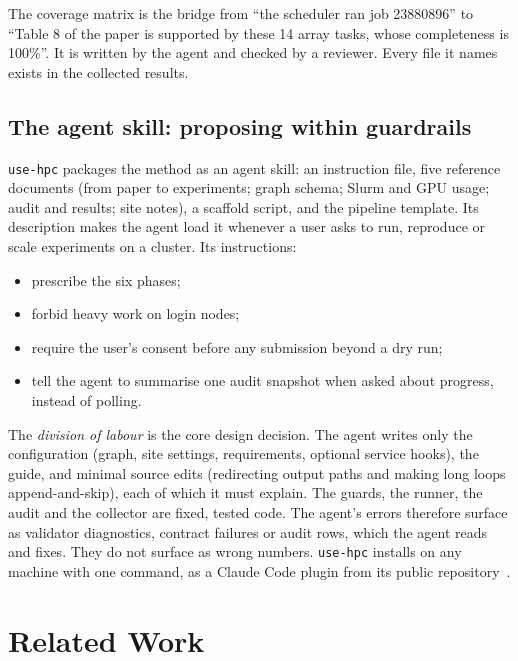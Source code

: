 \documentclass[pdflatex,sn-mathphys-num]{sn-jnl}
\theoremstyle{thmstyleone}%
\theoremstyle{thmstyletwo}%
\theoremstyle{thmstylethree}%
\newcommand{\skill}{\texttt{use-hpc}}
\begin{document}
The coverage matrix is the bridge from ``the scheduler ran job 23880896'' to
``Table 8 of the paper is supported by these 14 array tasks, whose completeness
is 100\%''. It is written by the agent and checked by a reviewer. Every file it
names exists in the collected results.

\subsection{The agent skill: proposing within guardrails}\label{sec:skill}

\skill{} packages the method as an agent skill: an instruction file, five
reference documents (from paper to experiments; graph schema; Slurm and GPU
usage; audit and results; site notes), a scaffold script, and the pipeline
template. Its description makes the agent load it whenever a user asks to run,
reproduce or scale experiments on a cluster. Its instructions:
\begin{itemize}[leftmargin=1.4em, itemsep=1pt]
\item prescribe the six phases;
\item forbid heavy work on login nodes;
\item require the user's consent before any submission beyond a dry run;
\item tell the agent to summarise one audit snapshot when asked about
progress, instead of polling.
\end{itemize}
The \emph{division of labour} is the core design decision. The agent writes
only the configuration (graph, site settings, requirements, optional service
hooks), the guide, and minimal source edits (redirecting output paths and
making long loops append-and-skip), each of which it must explain. The guards,
the runner, the audit and the collector are fixed, tested code. The agent's
errors therefore surface as validator diagnostics, contract failures or audit
rows, which the agent reads and fixes. They do not surface as wrong numbers.
\skill{} installs on any machine with one command, as a Claude Code plugin from
its public repository~\cite{usehpc2026repo}.

\section{Related Work}\label{sec:related}
\end{document}
